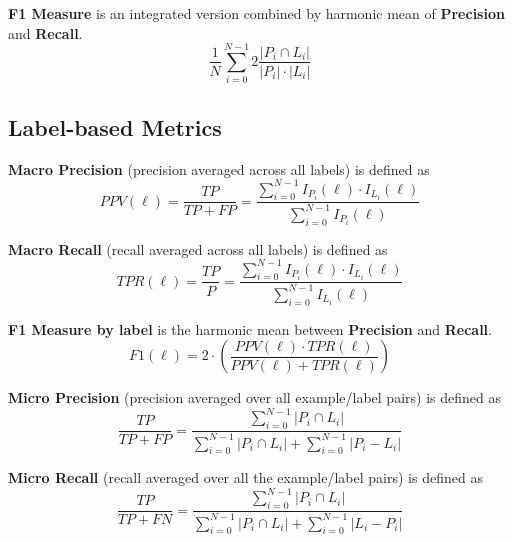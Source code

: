 \textbf{F1 Measure} is an integrated version combined by harmonic mean of \textbf{Precision} and \textbf{Recall}. 
\begin{equation}\label{eq:Accuracy}
\frac{1}{N} \sum_{i=0}^{N-1} 2 \frac{\left|P_i \cap L_i\right|}{\left|P_i\right| \cdot \left|L_i\right|}
\end{equation}

\subsection{Label-based Metrics}

\textbf{Macro Precision} (precision averaged across all labels) is defined as
\begin{equation}\label{eq:MacroPrecision}
PPV(\ell)=\frac{TP}{TP + FP}=
          \frac{\sum_{i=0}^{N-1} I_{P_i}(\ell) \cdot I_{L_i}(\ell)}
          {\sum_{i=0}^{N-1} I_{P_i}(\ell)}
\end{equation}

\textbf{Macro Recall} (recall averaged across all labels) is defined as
\begin{equation}\label{eq:MacroRecall}
TPR(\ell)=\frac{TP}{P}=
          \frac{\sum_{i=0}^{N-1} I_{P_i}(\ell) \cdot I_{L_i}(\ell)}
          {\sum_{i=0}^{N-1} I_{L_i}(\ell)}
\end{equation}

\textbf{F1 Measure by label} is the harmonic mean between \textbf{Precision} and \textbf{Recall}. 
\begin{equation}\label{eq:LabelAccuracy}
F1(\ell) = 2
                            \cdot \left(\frac{PPV(\ell) \cdot TPR(\ell)}
                            {PPV(\ell) + TPR(\ell)}\right)
\end{equation}

\textbf{Micro Precision} (precision averaged over all example/label pairs) is defined as
\begin{equation}\label{eq:MicroPrecision}
\frac{TP}{TP + FP}=\frac{\sum_{i=0}^{N-1} \left|P_i \cap L_i\right|}
          {\sum_{i=0}^{N-1} \left|P_i \cap L_i\right| + \sum_{i=0}^{N-1} \left|P_i - L_i\right|}
\end{equation}

\textbf{Micro Recall} (recall averaged over all the example/label pairs) is defined as
\begin{equation}\label{eq:MicroRecall}
\frac{TP}{TP + FN}=\frac{\sum_{i=0}^{N-1} \left|P_i \cap L_i\right|}
        {\sum_{i=0}^{N-1} \left|P_i \cap L_i\right| + \sum_{i=0}^{N-1} \left|L_i - P_i\right|}
\end{equation}

